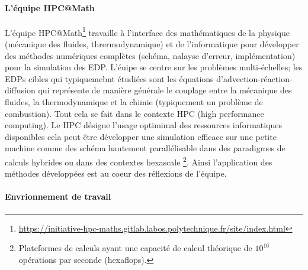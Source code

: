 \paragraph{L'équipe HPC@Math}
    L'équipe HPC@Math\footnote{\href{https://initiative-hpc-maths.gitlab.labos.polytechnique.fr/site/index.html}{https://initiative-hpc-maths.gitlab.labos.polytechnique.fr/site/index.html}} travaille à l'interface des mathématiques de la physique (mécanique des fluides, thrermodynamique) et de l'informatique pour développer 
    des méthodes numériques complètes (schéma, nalayse d'erreur, implémentation) pour la simulation des EDP. 
    L'éuipe se centre sur les problèmes multi-échelles; les EDPs cibles qui typiquemebnt étudiées sont les équations d'advection-réaction-diffusion qui représente 
    de manière générale le couplage entre la mécanique des fluides, la thermodynamique et la chimie (typiquement un problème de combustion).
    Tout cela se fait dans le contexte HPC (high performance computing). Le HPC désigne l'usage optimimal des ressources informatiques disponibles
    cela peut être développer une simulation efficace sur une petite machine comme des schéma hautement parallélisable 
    dans des paradigmes de calculs hybrides ou dans des contextes hexascale
    \footnote{Plateformes de calculs ayant une capacité de calcul théorique de $10^{16}$ opérations par seconde (hexaflops).}. 
    Ainsi l'application des méthodes développées
    est au coeur des réflexions de l'équipe. 
\paragraph{Envrionnement de travail}

